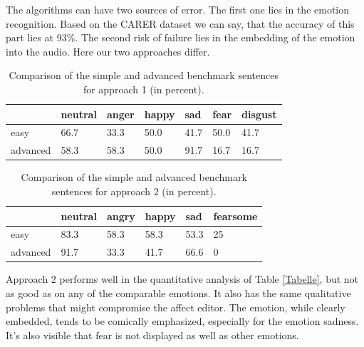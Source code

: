 \documentclass[11pt]{article}
\begin{document}
The algorithms can have two sources of error. The first one lies in the emotion recognition. Based on the CARER dataset \cite{saravia-etal-2018-carer} we can say, that the accuracy of this part lies at 93\%. The second risk of failure lies in the embedding of the emotion into the audio. Here our two approaches differ.

\begin{table}[h]

\small
\vspace{5px}
{
\begin{tabular}{|p{0.9cm}|p{0.65cm}|p{0.65cm}|p{0.65cm}|p{0.65cm}|p{0.65cm}|p{0.65cm}|}
\hline
\rowcolor{mintgreen}&neutral&anger&happy&sad&fear&disgust\\
\hline
\cellcolor{gainsboro}easy&66.7&33.3&50.0&41.7&50.0&41.7\\
\hline
\cellcolor{gainsboro}advanced&58.3&58.3&50.0&91.7&16.7&16.7\\
\hline
\end{tabular}
}

\caption{Comparison of the simple and advanced benchmark sentences for approach 1 (in percent).}
\label{Tabelle2}
\end{table}

\begin{table}[h]

\small
\vspace{5px}
{
\begin{tabular}{|l|l|l|l|l|l|}
\hline
\rowcolor{mintgreen}&neutral&angry&happy&sad&fearsome\\
\hline
\cellcolor{gainsboro}easy&83.3&58.3&58.3&53.3&25\\
\hline
\cellcolor{gainsboro}advanced&91.7&33.3&41.7&66.6&0\\
\hline
\end{tabular}
}

\caption{Comparison of the simple and advanced benchmark sentences for approach 2 (in percent).}
\label{Tabelle3}
\end{table}

Approach 2 performs well in the quantitative analysis of Table \ref{Tabelle}, but not as good as \cite{cahn_generation_2000} on any of the comparable emotions. It also has the same qualitative problems that might compromise the affect editor. The emotion, while clearly embedded, tends to be comically emphasized, especially for the emotion sadness. It's also visible that fear is not displayed as well as other emotions.
\end{document}
